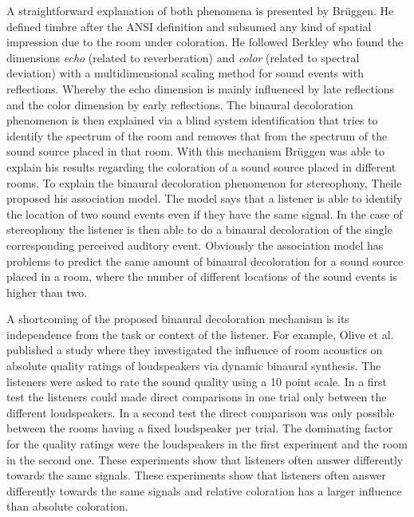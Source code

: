 A straightforward explanation of both phenomena is presented by
Brüggen\autocite{Bruggen2001}. He defined timbre after the
ANSI\autocite{ANSI1994} definition and
subsumed any kind of spatial impression due to the room under coloration. He
followed Berkley\autocite{Berkley1987} who found the dimensions \emph{echo}
(related to reverberation) and
\emph{color} (related to spectral deviation) 
with a multidimensional scaling method for sound events with
reflections. Whereby the echo dimension is mainly influenced by late reflections
and the color dimension by early reflections. The binaural decoloration
phenomenon is then explained via a blind system identification that tries to
identify the spectrum of the room and removes that from the spectrum of the
sound source placed in that room. With this mechanism Brüggen was able to
explain his results regarding the coloration of a sound source placed in
different rooms.\autocite[][Fig.\,5.11]{Bruggen2001}
\FloatBarrier
To explain the binaural decoloration phenomenon for stereophony,
Theile\autocite{Theile1980} proposed his association model. The model says that a
listener is able to identify the location of two sound events even if they have
the same signal. In the case of stereophony the listener is then able to do a
binaural decoloration of the single corresponding perceived auditory event.
Obviously the association model has problems to predict the same amount
of binaural decoloration for a sound source placed in a room, where the number
of different locations of the sound events is higher than two.

A shortcoming of the proposed binaural decoloration mechanism is its
independence from the task or context of the listener. For example, Olive et
al.\autocite{Olive1995} published a study where they investigated the influence of room
acoustics on absolute quality ratings
of loudspeakers via dynamic binaural
synthesis. The listeners were asked to rate the sound quality using a 10 point
scale. In a first test the listeners could made direct comparisons in one
trial only between the different loudspeakers. In a second test the direct
comparison was only possible between the rooms having a fixed loudspeaker per
trial. The dominating factor for the quality ratings were the loudspeakers in
the first experiment and the room in the second one. These experiments show that
listeners often answer differently towards the same signals.
These experiments show that listeners often answer differently towards the same
signals and relative coloration has a larger influence than absolute coloration.

